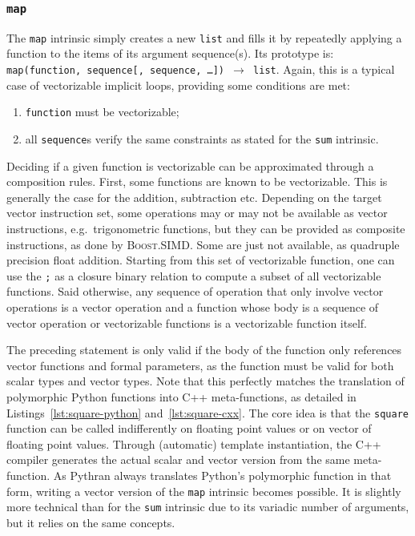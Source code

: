 \documentclass[preprint]{sigplanconf}
\providecommand{\boostsimd}{\textsc{Boost.SIMD}}
\begin{document}
\subsubsection{\texttt{map}}

The \texttt{map} intrinsic simply creates a new \texttt{list} and fills it by
repeatedly applying a function to the items of its argument sequence(s). Its
prototype is: \texttt{map(function, sequence[, sequence, \dots]) $\rightarrow$
list}. Again, this is a typical case of vectorizable implicit loops, providing
some conditions are met:

\begin{enumerate}

    \item[\label{enu:pure}] \texttt{function} must be vectorizable;
    \item[\label{enu:sequence}] all \texttt{sequence}s verify the same constraints as stated for the \texttt{sum} intrinsic.

\end{enumerate}

Deciding if a given function is vectorizable can be approximated through a
composition rules. First, some functions are known to be vectorizable. This is
generally the case for the addition, subtraction etc. Depending on the target
vector instruction set, some operations may or may not be available as vector
instructions, e.g.\ trigonometric functions, but they can be provided as
composite instructions, as done by \boostsimd. Some are just not available, as
quadruple precision float addition. Starting from this set of vectorizable
function, one can use the \texttt{;} as a closure binary relation to compute a
subset of all vectorizable functions. Said otherwise, any sequence of operation
that only involve vector operations is a vector operation and a function whose
body is a sequence of vector operation or vectorizable functions is a
vectorizable function itself.

The preceding statement is only valid if the body of the function only
references vector functions and formal parameters, as the function must be
valid for both scalar types and vector types. Note that this perfectly matches
the translation of polymorphic Python functions into C++ meta-functions, as
detailed in Listings~\ref{lst:square-python} and~\ref{lst:square-cxx}. The core
idea is that the \texttt{square} function can be called indifferently on
floating point values or on vector of floating point values. Through
(automatic) template instantiation, the C++ compiler generates the actual
scalar and vector version from the same meta-function. As Pythran always
translates Python's polymorphic function in that form, writing a vector version
of the \texttt{map} intrinsic becomes possible. It is slightly more technical
than for the \texttt{sum} intrinsic due to its variadic number of arguments,
but it relies on the same concepts.
\end{document}

